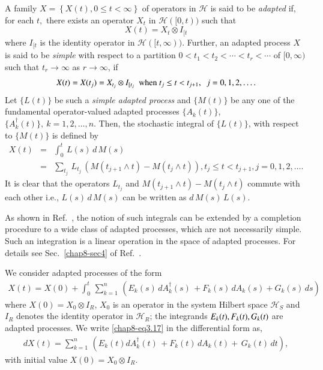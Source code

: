 A family $X = \left \{ X(t), 0 \leq t < \infty \right \}$ of operators in  $\mathcal{H}$ is said to be {\it adapted} if, for each $t,$ there exists an operator $X_t$ in $\mathcal{H}([0,t))$ such that 
$$
X(t) = X_t \otimes I_{[t}
$$ 
where $I_{[t}$ is the identity operator in $\mathcal{H}([t,\infty)).$  Further, an adapted process $X$ is said to be {\it simple} with respect to a partition $0 < t_1 < t_2 < \cdots < t_r < \cdots $ of $[0, \infty)$ such that $t_r \rightarrow \infty$ as $r \rightarrow \infty$, if 
\begin{equation}
X(t)=X({t_j})=X_{t_j} \otimes I_{[t_j} \ \  {\rm when}\ t_j\leq t<t_{j+1},\ \ j=0,1,2,\ldots .  \label{chap8-eq15}
\end{equation}
Let $\{L(t)\}$ be such a {\it simple adapted process} and $\{M(t)\}$ be any one of the fundamental operator-valued adapted processes $\{A_k(t)\}$, $\{A_k^\dag(t)\},\ k=1,2,\ldots, n$. Then,  the stochastic integral of   $\{L(t)\}$, with respect to  $\{M(t)\}$  is defined by  
\begin{eqnarray}
		X(t)&=&\int_{0}^t\,  L(s)\, d\, M(s)  \nonumber \\
		&=&\sum_{t_j}\, L_{t_j}\, \left( M (t_{j+1} \wedge t)- M (t_{j} \wedge t)\right), t_j\leq t<t_{j+1},  j=0,1,2,\ldots. \label{chap8-eq3.16} 
\end{eqnarray}
It is clear that the operators $L_{t_j}$ and  $M (t_{j+1} \wedge t)- M (t_{j} \wedge t)$ commute with each other i.e., $ L(s)\, d\, M(s)$ can be written as $d\, M(s)\, L(s).$ 

As shown in Ref.~\cite{chap8-key7}, the notion of such integrals can be extended by a completion procedure to a wide class of adapted processes, which are not necessarily simple. Such an integration is a linear operation in the space of adapted processes.  For details see Sec.\ \ref{chap8-sec4} of Ref.~\cite{chap8-key7}. 

We consider adapted processes of the form  
\begin{eqnarray}
		X(t)=X(0)+ \int_0^t\, \sum_{k=1}^n\, \left(E_{k}(s)\, dA^\dag_k(s)\, + F_{k}(s)\, dA_k(s)+ G_{k}(s)\, ds\right)  \label{chap8-eq3.17}
\end{eqnarray}    
where $X(0)=X_0\otimes I_R$,  $X_0$ is an operator in the system Hilbert space $\mathcal{H}_S$ and $I_R$ denotes the identity operator in $\mathcal{H}_R$; the integrands $E_k(t), F_k(t),\break G_k(t)$ are adapted processes. 
We write \eqref{chap8-eq3.17}  in the differential form as, 
\begin{eqnarray}
		dX(t)=\sum_{k=1}^n\, \left( E_{k}(t) dA^\dag_k(t)\, + F_{k}(t)\, dA_k(t)+\,  G_{k}(t)\, dt\right),  \label{chap8-eq3.18}
\end{eqnarray}    
with initial value $X(0)=X_0\otimes I_R$. 

